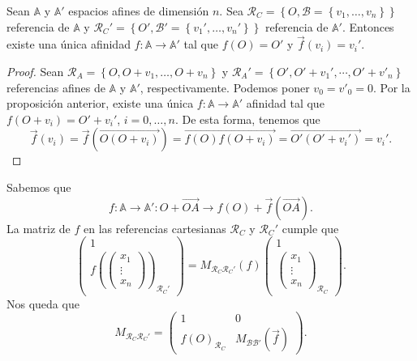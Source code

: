 \begin{prop}
	Sean $\displaystyle \mathbb{A} $ y $\displaystyle \mathbb{A}' $ espacios afines de dimensión $\displaystyle n $. Sea $\displaystyle \mathcal{R}_{C} = \left\{ O, \mathcal{B} = \left\{ v_{1}, \ldots, v_{n}\right\} \right\}  $ referencia de $\displaystyle \mathbb{A} $ y $\displaystyle \mathcal{R}_{C}' = \left\{ O', \mathcal{B}' = \left\{ v_{1}', \ldots, v_{n}'\right\} \right\}  $ referencia de $\displaystyle \mathbb{A}' $. Entonces existe una única afinidad $\displaystyle f : \mathbb{A} \to \mathbb{A}' $ tal que $\displaystyle f\left(O\right) = O' $ y $\displaystyle \vec{f}\left(v_{i}\right) = v_{i}' $.
\end{prop}
\begin{proof}
	Sean $\displaystyle \mathcal{R}_{A} = \left\{ O, O + v_{1}, \ldots, O + v_{n}\right\}  $ y $\displaystyle \mathcal{R}_{A}' = \left\{ O', O' + v_{1}' , \cdots , O' + v'_{n}\right\}  $ referencias afines de $\displaystyle \mathbb{A} $ y $\displaystyle \mathbb{A}' $, respectivamente. Podemos poner $\displaystyle v_{0} = v'_{0} = 0 $. Por la proposición anterior, existe una única $\displaystyle f : \mathbb{A} \to \mathbb{A}' $ afinidad tal que $\displaystyle f\left(O + v_{i}\right) = O' + v_{i}' $, $\displaystyle i = 0, \ldots, n $. 
	De esta forma, tenemos que 
	\[\vec{f}\left(v_{i}\right) = \vec{f}\left(\overrightarrow{O \left(O + v_{i}\right)}\right) = \overrightarrow{f\left(O\right)f\left(O + v_{i}\right)} = \overrightarrow{O'\left(O'+v_{i}'\right)} = v_{i}'.\]
\end{proof}
\begin{observation}
Sabemos que 
\[ f : \mathbb{A} \to \mathbb{A}' : O + \overrightarrow{OA} \to f\left(O\right) + \vec{f}\left(\overrightarrow{OA}\right) .\]
La matriz de $\displaystyle f $ en las referencias cartesianas $\displaystyle \mathcal{R}_{C} $ y $\displaystyle \mathcal{R}_{C}' $ cumple que
\[\begin{pmatrix} 1 \\ f\left(\begin{pmatrix} x_{1} \\ \vdots \\ x_{n} \end{pmatrix}\right)_{\mathcal{R}_{C}'} \end{pmatrix} = M_{\mathcal{R}_{C}\mathcal{R}_{C}'}\left(f\right)\begin{pmatrix} 1 \\ \begin{pmatrix} x_{1} \\ \vdots \\ x_{n} \end{pmatrix} _{\mathcal{R}_{C}} \end{pmatrix}.\]
Nos queda que 
\[M_{\mathcal{R}_{C}\mathcal{R}_{C}'} = \begin{pmatrix} 1 & 0  \\ f\left(O\right)_{\mathcal{R}_{C}} & M_{\mathcal{B}\mathcal{B}'}\left(\vec{f}\right) \end{pmatrix} .\]
\end{observation}
